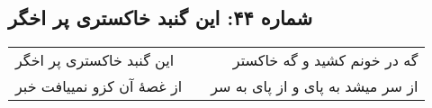 \begin{center}
\section*{شماره ۴۴: این گنبد خاکستری پر اخگر}
\label{sec:044}
\begin{longtable}{l p{0.5cm} r}
این گنبد خاکستری پر اخگر
&&
گه در خونم کشید و گه خاکستر
\\
از غصهٔ آن کزو نمییافت خبر
&&
از سر میشد به پای و از پای به سر
\\
\end{longtable}
\end{center}
